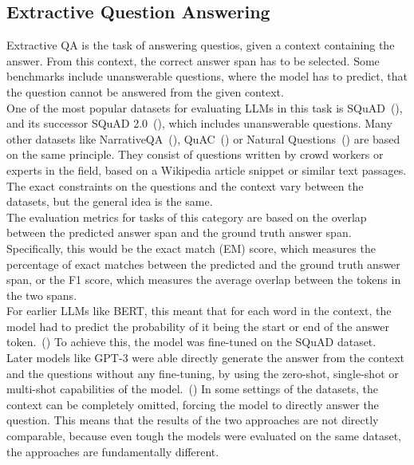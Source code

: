 \subsection{Extractive Question Answering}\label{extractive-qa}
Extractive QA is the task of answering questios, given a context containing the answer.
From this context, the correct answer span has to be selected.
Some benchmarks include unanswerable questions, where the model has to predict, that the question cannot be answered from the given context.
\\
One of the most popular datasets for evaluating LLMs in this task is SQuAD~(\cite{rajpurkar:2016}), and its successor SQuAD 2.0~(\cite{rajpurkar:2018}), which includes unanswerable questions.
Many other datasets like NarrativeQA~(\cite{kovcisky:2018}), QuAC~(\cite{choi:2018}) or Natural Questions~(\cite{kwiatkowski:2019}) are based on the same principle.
They consist of questions written by crowd workers or experts in the field, based on a Wikipedia article snippet or similar text passages.
The exact constraints on the questions and the context vary between the datasets, but the general idea is the same.
\\
The evaluation metrics for tasks of this category are based on the overlap between the predicted answer span and the ground truth answer span.
Specifically, this would be the exact match (EM) score, which measures the percentage of exact matches between the predicted and the ground truth answer span, or the F1 score, which measures the average overlap between the tokens in the two spans.
\\
For earlier LLMs like BERT, this meant that for each word in the context, the model had to predict the probability of it being the start or end of the answer token.~(\cite{devlin:2018})
To achieve this, the model was fine-tuned on the SQuAD dataset. 
\\
Later models like GPT-3 were able directly generate the answer from the context and the questions without any fine-tuning, by using the zero-shot, single-shot or multi-shot capabilities of the model.~(\cite{brown:2020})
In some settings of the datasets, the context can be completely omitted, forcing the model to directly answer the question.
This means that the results of the two approaches are not directly comparable, because even tough the models were evaluated on the same dataset, the approaches are fundamentally different.


